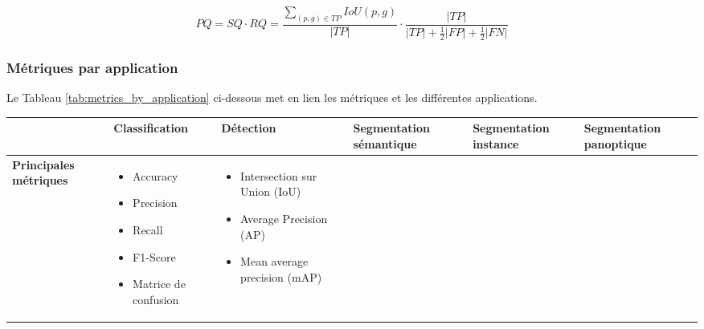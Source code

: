 \begin{equation}
PQ = SQ \cdot RQ = \frac{\sum_{(p,g) \in TP} IoU(p,g)}{|TP|} \cdot \frac{|TP|}{|TP| + \frac{1}{2}|FP| + \frac{1}{2}|FN|}
\label{eq:panoptic_quality}
\end{equation}

\subsubsection{Métriques par application}

Le Tableau \ref{tab:metrics_by_application} ci-dessous met en lien les métriques et les différentes applications.

\begin{table}[H]
    \centering
    \begin{tabular}{|p{1.8cm}|p{2.1cm}|p{2.4cm}|p{2.5cm}|p{2.2cm}|p{2.2cm}|}
    \cline{2-6}
    \multicolumn{1}{c|}{} & \textbf{Classification} & \textbf{Détection} & \textbf{Segmentation sémantique} & \textbf{Segmentation instance} & \textbf{Segmentation panoptique} \\
    \hline
    \textbf{Principales métriques} & 
    \begin{itemize}[leftmargin=*, topsep=0pt, itemsep=0pt, parsep=0pt, before=\vspace{-\baselineskip}, after=\vspace{-\baselineskip}]
        \item Accuracy
        \item Precision
        \item Recall
        \item F1-Score
        \item Matrice de confusion
    \end{itemize} & 
    \begin{itemize}[leftmargin=*, topsep=0pt, itemsep=0pt, parsep=0pt, before=\vspace{-\baselineskip}, after=\vspace{-\baselineskip}]
        \item Intersection sur Union (IoU)
        \item Average Precision (AP)
        \item Mean average precision (mAP)
    \end{itemize} & 
    \begin{itemize}[leftmargin=*, topsep=0pt, itemsep=0pt, parsep=0pt, before=\vspace{-\baselineskip}, after=\vspace{-\baselineskip}]

\end{itemize}
\end{tabular}
\end{table}
